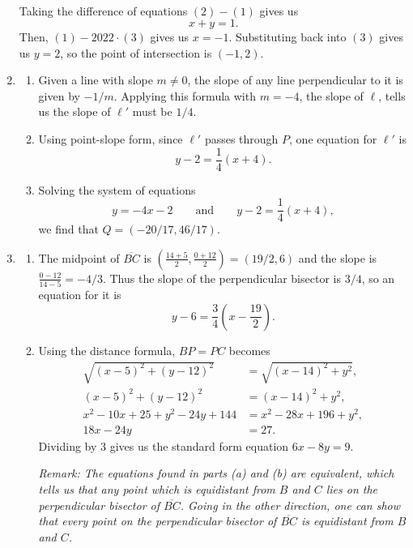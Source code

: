 \begin{enumerate}
\begin{align*}
\end{align*}
Taking the difference of equations $(2) - (1)$ gives us 
\begin{equation*}
x + y = 1 \tag{3}.
\end{equation*}
Then, $(1) - 2022\cdot (3)$ gives us $x = -1$. Substituting back into $(3)$ gives us $y = 2$, so the point of intersection is $\boxed{(-1,2)}$.
\item \begin{enumerate}
\item Given a line with slope $m\neq 0$, the slope of any line perpendicular to it is given by $-1/m$. Applying this formula with $m = -4$, the slope of $\ell$, tells us the slope of $\ell'$ must be $\boxed{1/4}$.
\item Using point-slope form, since $\ell'$ passes through $P$, one equation for $\ell'$ is 
\begin{equation*}
\boxed{y - 2 = \frac{1}{4}(x + 4)}.
\end{equation*}
\item Solving the system of equations
\begin{equation*}
y = -4x - 2\qquad\text{and}\qquad y - 2 = \frac{1}{4}(x + 4),
\end{equation*}
we find that $Q = \boxed{(-20/17, 46/17)}$.
\end{enumerate}
\item \begin{enumerate}
\item The midpoint of $\overline{BC}$ is $(\frac{14 + 5}{2}, \frac{0 + 12}{2}) = (19/2, 6)$ and the slope is $\frac{0 - 12}{14 - 5} = -4/3$. Thus the slope of the perpendicular bisector is $3/4$, so an equation for it is 
\begin{equation*}
\boxed{y - 6 = \frac{3}{4}\left(x - \frac{19}{2}\right)}.
\end{equation*}
\item Using the distance formula, $BP = PC$ becomes
\begin{align*}
\sqrt{(x - 5)^2 + (y - 12)^2} &= \sqrt{(x - 14)^2 + y^2}, \\
(x - 5)^2 + (y - 12)^2 &= (x - 14)^2 + y^2, \\
x^2 - 10x + 25 + y^2 - 24y + 144 &= x^2 - 28x + 196 + y^2, \\
18x - 24y &= 27.
\end{align*}
Dividing by $3$ gives us the standard form equation $\boxed{6x - 8y = 9}$.\par 
\emph{Remark: The equations found in parts (a) and (b) are equivalent, which tells us that any point which is equidistant from $B$ and $C$ lies on the perpendicular bisector of $\overline{BC}$. Going in the other direction, one can show that every point on the perpendicular bisector of $\overline{BC}$ is equidistant from $B$ and $C$.}

\end{enumerate}
\end{enumerate}
